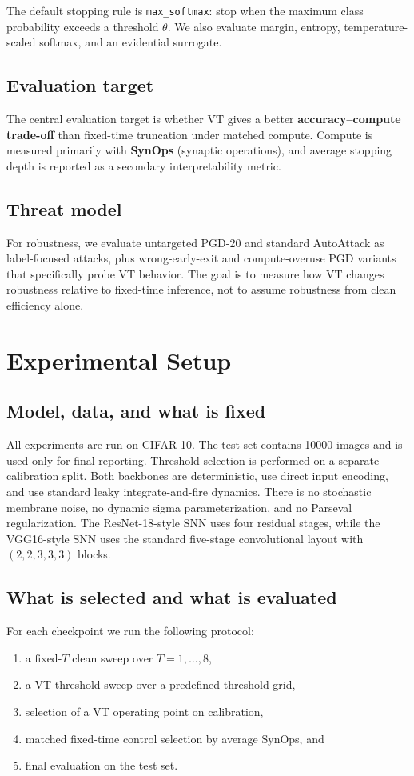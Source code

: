 \documentclass[11pt]{article}
\begin{document}
The default stopping rule is \texttt{max\_softmax}: stop when the maximum class probability exceeds a threshold $\theta$. We also evaluate margin, entropy, temperature-scaled softmax, and an evidential surrogate.

\subsection{Evaluation target}
The central evaluation target is whether VT gives a better \textbf{accuracy--compute trade-off} than fixed-time truncation under matched compute. Compute is measured primarily with \textbf{SynOps} (synaptic operations), and average stopping depth is reported as a secondary interpretability metric.

\subsection{Threat model}
For robustness, we evaluate untargeted PGD-20 and standard AutoAttack as label-focused attacks, plus wrong-early-exit and compute-overuse PGD variants that specifically probe VT behavior. The goal is to measure how VT changes robustness relative to fixed-time inference, not to assume robustness from clean efficiency alone.

\section{Experimental Setup}
\subsection{Model, data, and what is fixed}
All experiments are run on CIFAR-10. The test set contains \num{10000} images and is used only for final reporting. Threshold selection is performed on a separate calibration split. Both backbones are deterministic, use direct input encoding, and use standard leaky integrate-and-fire dynamics. There is no stochastic membrane noise, no dynamic sigma parameterization, and no Parseval regularization. The ResNet-18-style SNN uses four residual stages, while the VGG16-style SNN uses the standard five-stage convolutional layout with $(2,2,3,3,3)$ blocks.

\subsection{What is selected and what is evaluated}
For each checkpoint we run the following protocol:
\begin{enumerate}[leftmargin=1.3em]
\item a fixed-$T$ clean sweep over $T=1,\dots,8$,
\item a VT threshold sweep over a predefined threshold grid,
\item selection of a VT operating point on calibration,
\item matched fixed-time control selection by average SynOps, and
\item final evaluation on the test set.
\end{enumerate}
\end{document}
